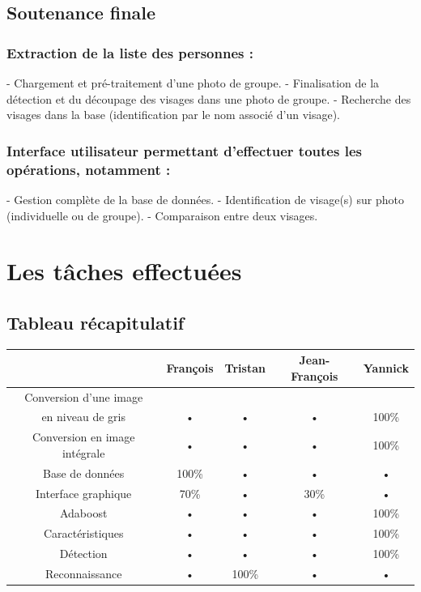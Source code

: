 \documentclass[12pt,a4paper]{article}
\begin{document}
\subsection{Soutenance finale}
\subsubsection{Extraction de la liste des personnes :}
- Chargement et pré-traitement d'une photo de groupe.
\newline
- Finalisation de la détection et du découpage des visages dans une photo de groupe.
\newline
- Recherche des visages dans la base (identification par le nom associé d'un visage).

\subsubsection{Interface utilisateur permettant d'effectuer toutes les opérations, notamment :}
- Gestion complète de la base de données.
\newline
- Identification de visage(s) sur photo (individuelle ou de groupe).
\newline
- Comparaison entre deux visages.

\newpage
\section{Les tâches effectuées}
\subsection{Tableau récapitulatif}

\begin{tabular}{|c|c|c|c|c|}
\hline 
 & François & Tristan & Jean-François & Yannick \\ 
\hline 
Conversion d'une image & & & & \\ 
en niveau de gris & • & • & • & 100\% \\ 
\hline 
Conversion en image intégrale & • & • & • & 100\% \\ 
\hline 
Base de données & 100\% & • & • & • \\ 
\hline 
Interface graphique & 70\% & • & 30\% & • \\ 
\hline 
Adaboost & • & •  & • & 100\% \\ 
\hline 
Caractéristiques & • & • & • & 100\%  \\  
\hline
Détection & • & • & • & 100\%  \\  
\hline  
Reconnaissance & • & 100\% & • & •  \\  
\hline 
\end{tabular} 
\end{document}
